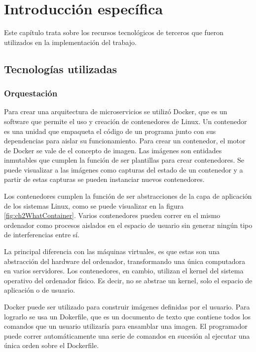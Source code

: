 \chapter{Introducción específica} %

\label{Chapter2}

Este capítulo trata sobre los recursos tecnológicos de terceros que fueron utilizados en la implementación del trabajo.

\section{Tecnologías utilizadas}

\subsection{Orquestación}
Para crear una arquitectura de microservicios se utilizó Docker, que es un software que permite el uso y creación de contenedores de Linux.
Un contenedor es una unidad que empaqueta el código de un programa junto con sus dependencias para aislar su funcionamiento.
Para crear un contenedor, el motor de Docker se vale de el concepto de imagen.
Las imágenes son entidades inmutables que cumplen la función de ser plantillas para crear contenedores.
Se puede visualizar a las imágenes como capturas del estado de un contenedor y a partir de estas capturas se pueden instanciar nuevos contenedores.

Los contenedores cumplen la función de ser abstracciones de la capa de aplicación de los sistemas Linux, como se puede visualizar en la figura \ref{fig:ch2WhatContainer}.
Varios contenedores pueden correr en el mismo ordenador como procesos aislados en el espacio de usuario sin generar ningún tipo de interferencias entre sí.

La principal diferencia con las máquinas virtuales, es que estas son una abstracción del hardware del ordenador, transformando una única computadora en varios servidores.
Los contenedores, en cambio, utilizan el kernel del sistema operativo del ordenador físico.
Es decir, no se abstrae un kernel, solo el espacio de aplicación o de usuario.

Docker puede ser utilizado para construir imágenes definidas por el usuario.
Para lograrlo se usa un Dokerfile, que es un documento de texto que contiene todos los comandos que un usuario utilizaría para ensamblar una imagen.
El programador puede correr automáticamente una serie de comandos en sucesión al ejecutar una única orden sobre el Dockerfile.

